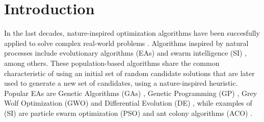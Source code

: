 \documentclass[review]{elsarticle}
\begin{document}
\linenumbers

\section{Introduction}

In the last decades, nature-inspired optimization algorithms have been succesfully
applied to solve complex real-world problems \cite{yang2014nature}. Algorithms
inspired by natural processes include evolutionary algorithms (EAs)
\cite{back1996evolutionary} and swarm intelligence (SI) \cite{kennedy2006swarm},
among others. These population-based algorithms share the common characteristic
of using an initial set of random candidate solutions that are later used to
generate a new set of candidates, using a nature-inspired heuristic. Popular EAs
are Genetic Algorithms (GAs) \cite{holland1992adaptation,eiben2003genetic}, 
Genetic Programming (GP) \cite{back1996evolutionary}, Grey Wolf Optimization
(GWO) \cite{mirjalili2014grey} and Differential Evolution (DE) \cite{karabouga2004simple},
while examples of (SI) \cite{kennedy2006swarm} are particle swarm
optimization (PSO) \cite{clerc2010particle} and ant colony algorithms (ACO) \cite{dorigo1999ant}.
\end{document}
